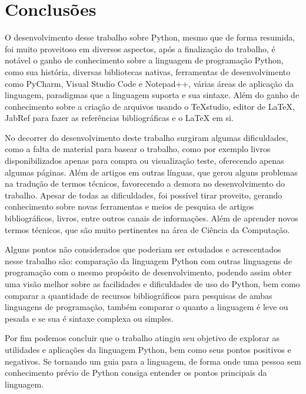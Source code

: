 

\chapter{Conclusões}

O desenvolvimento desse trabalho sobre Python, mesmo que de forma resumida, foi muito proveitoso em diversos aspectos, após a finalização do trabalho, é notável o ganho de conhecimento sobre a linguagem de programação Python, como sua história, diversas bibliotecas nativas, ferramentas de desenvolvimento como PyCharm, Visual Studio Code e Notepad++, várias áreas de aplicação da linguagem, paradigmas que a linguagem suporta e sua sintaxe. Além do ganho de conhecimento sobre a criação de arquivos usando o TeXstudio, editor de LaTeX, JabRef para fazer as referências bibliográficas e o LaTeX em si. 

No decorrer do desenvolvimento deste trabalho surgiram algumas dificuldades, como a falta de material para basear o trabalho, como por exemplo livros disponibilizados apenas para compra ou visualização teste, oferecendo apenas algumas páginas. Além de artigos em outras línguas, que gerou alguns problemas na tradução de termos técnicos, favorecendo a demora no desenvolvimento do trabalho. Apesar de todas as dificuldades, foi possível tirar proveito, gerando conhecimento sobre novas ferramentas e meios de pesquisa de artigos bibliográficos, livros, entre outros canais de informações. Além de aprender novos termos técnicos, que são muito pertinentes na área de Ciência da Computação.

Alguns pontos não considerados que poderiam ser estudados e acrescentados nesse trabalho são: comparação da linguagem Python com outras linguagens de programação com o mesmo propósito de desenvolvimento, podendo assim obter uma visão melhor sobre as facilidades e dificuldades de uso do Python, bem como comparar a quantidade de recursos bibliográficos para pesquisas de ambas linguagens de programação, também comparar o quanto a linguagem é leve ou pesada e se sua  é sintaxe complexa ou simples. 

Por fim podemos concluir que o trabalho atingiu seu objetivo de explorar as utilidades e aplicações da linguagem Python, bem como seus pontos positivos e negativos. Se tornando um guia para a linguagem, de forma onde uma pessoa sem conhecimento prévio de Python consiga entender os pontos principais da linguagem.